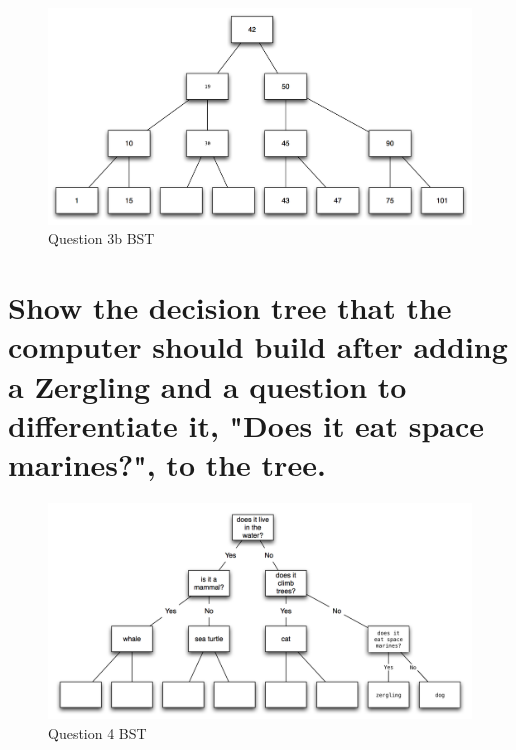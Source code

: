 \documentclass[letter,11pt]{scrartcl}
\begin{document}
\begin{figure}[H]
  \centering
  \includegraphics[width=1.0\textwidth]{bst_3b}
  \caption{Question 3b BST}
\end{figure}


\section{Show the decision tree that the computer should build after adding a
  Zergling and a question to differentiate it, "Does it eat space marines?",
  to the tree.}

\begin{figure}[H]
  \centering
  \includegraphics[width=1.0\textwidth]{bst_4}
  \caption{Question 4 BST}
\end{figure}


\end{document}
